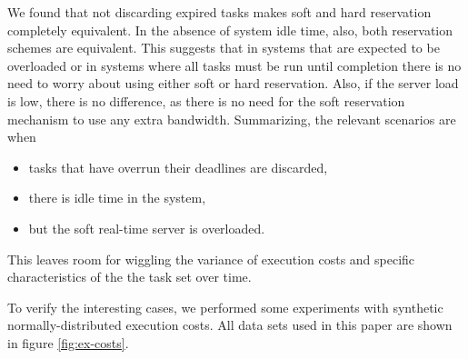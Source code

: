 \documentclass[times, 10pt,twocolumn]{article}
\begin{document}
We found that not discarding expired tasks makes soft and hard
reservation completely equivalent. In the absence of system idle time,
also, both reservation schemes are equivalent. This suggests that in
systems that are expected to be overloaded or in systems where all
tasks must be run until completion there is no need to worry about
using either soft or hard reservation. Also, if the server load is
low, there is no difference, as there is no need for the soft
reservation mechanism to use any extra bandwidth. Summarizing, the
relevant scenarios are when
\begin{itemize}
\item tasks that have overrun their deadlines are discarded,
\item there is idle time in the system,
\item but the soft real-time server is overloaded.
\end{itemize}
This leaves room for wiggling the variance of execution costs and
specific characteristics of the the task set over time.

To verify the interesting cases, we performed some experiments with
synthetic normally-distributed execution costs. All data sets used in
this paper are shown in figure \ref{fig:ex-costs}.

\label{sec:synthetic-task}
\end{document}
